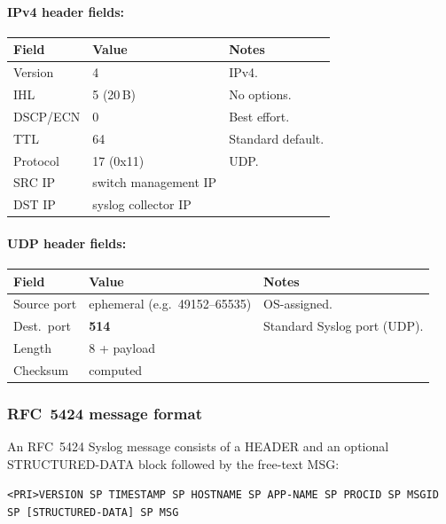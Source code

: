 \documentclass[12pt,a4paper]{article}
\begin{document}
\paragraph{IPv4 header fields:}
\begin{center}
\begin{tabular}{lll}
\toprule
\textbf{Field} & \textbf{Value} & \textbf{Notes} \\
\midrule
Version      & 4            & IPv4. \\
IHL          & 5 (20\,B)    & No options. \\
DSCP/ECN     & 0            & Best effort. \\
TTL          & 64           & Standard default. \\
Protocol     & 17 (0x11)    & UDP. \\
SRC IP       & switch management IP & \\
DST IP       & syslog collector IP & \\
\bottomrule
\end{tabular}
\end{center}

\paragraph{UDP header fields:}
\begin{center}
\begin{tabular}{lll}
\toprule
\textbf{Field} & \textbf{Value} & \textbf{Notes} \\
\midrule
Source port  & ephemeral (e.g.\ 49152--65535) & OS-assigned. \\
Dest.\ port  & \textbf{514}   & Standard Syslog port (UDP). \\
Length       & 8 + payload    & \\
Checksum     & computed       & \\
\bottomrule
\end{tabular}
\end{center}

\subsubsection{RFC~5424 message format}

An RFC~5424 Syslog message consists of a HEADER and an optional
STRUCTURED-DATA block followed by the free-text MSG:

\begin{center}
\texttt{<PRI>VERSION SP TIMESTAMP SP HOSTNAME SP APP-NAME SP PROCID SP MSGID
SP [STRUCTURED-DATA] SP MSG}
\end{center}
\end{document}
